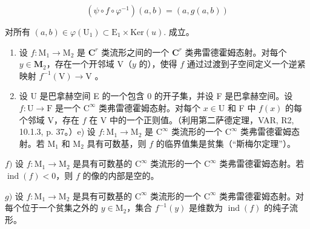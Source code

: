 \[
(\psi \circ f \circ \varphi^ {- 1}) (a, b) = (a, g (a, b))
\]

对所有 \((a,b)\in \varphi (\mathrm{U}_1)\subset \mathrm{E}_1\times \mathrm{Ker}(u).\) 成立。

\begin{enumerate}
\def\labelenumi{\alph{enumi})}
\setcounter{enumi}{2}
\item
  设 \(f \colon \mathrm{M}_1 \to \mathrm{M}_2\) 是 \(\mathbf{C}^r\) 类流形之间的一个 \(\mathbf{C}^r\) 类弗雷德霍姆态射。对每个 \(y \in \mathbf{M}_2\)，存在一个开邻域 \(\mathrm{V}\)（\(y\) 的），使得 \(f\) 通过过渡到子空间定义一个逆紧映射 \(f^{-1}(\mathrm{V}) \to \mathrm{V}\) 。
\item
  设 U 是巴拿赫空间 E 的一个包含 0 的开子集，并设 F 是巴拿赫空间。设 \(f \colon \mathrm{U} \to \mathrm{F}\) 是一个 \(\mathrm{C}^{\infty}\) 类弗雷德霍姆态射。对每个 \(x \in \mathrm{U}\) 和 F 中 \(f(x)\) 的每个邻域 V，存在 \(f\) 在 V 中的一个正则值。（利用第二萨德定理，VAR, R2, 10.1.3, p. 37。）e) 设 \(f \colon \mathrm{M}_1 \to \mathrm{M}_2\) 是 \(\mathrm{C}^{\infty}\) 类流形的一个 \(\mathrm{C}^{\infty}\) 类弗雷德霍姆态射。若 \(\mathrm{M}_1\) 和 \(\mathrm{M}_2\) 具有可数基，则 \(f\) 的临界值集是贫集（“斯梅尔定理”）。
\end{enumerate}

\(f)\) 设 \(f\colon \mathrm{M}_1\to \mathrm{M}_2\) 是具有可数基的 \(\mathrm{C}^{\infty}\) 类流形的一个 \(\mathrm{C}^{\infty}\) 类弗雷德霍姆态射。若 \(\operatorname {ind}(f) < 0\)，则 \(f\) 的像的内部是空的。

\(g)\) 设 \(f\colon \mathrm{M}_1\to \mathrm{M}_2\) 是具有可数基的 \(\mathrm{C}^{\infty}\) 类流形的一个 \(\mathrm{C}^{\infty}\) 类弗雷德霍姆态射。对每个位于一个贫集之外的 \(y\in \mathrm{M}_2\)，集合 \(f^{-1}(y)\) 是维数为 \(\operatorname {ind}(f)\) 的纯子流形。
\relax{}
